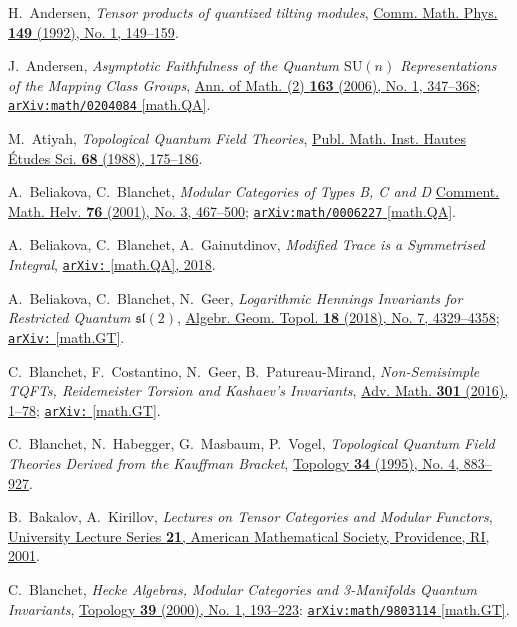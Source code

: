 \documentclass[a4paper,reqno]{amsart}
\theoremstyle{definition}
\theoremstyle{remark}
\newcommand\arxiv[2]{\href{https://arXiv.org/abs/#1}{\texttt{arXiv:\allowbreak #1} #2}}
\newcommand\doi[2]{\href{https://doi.org/#1}{#2}}
\begin{document}
\begin{thebibliography}{99}
 
 H.~Andersen, 
 \textit{Tensor products of quantized tilting modules},
 \doi{10.1007/BF02096627}{Comm. Math. Phys. \textbf{149} (1992), No. 1, 149--159}.
 
 J.~Andersen,
 \textit{Asymptotic Faithfulness of the Quantum $\mathrm{SU}(n)$ Representations of the Mapping Class Groups},
 \doi{10.4007/annals.2006.163.347}{Ann. of Math. (2) \textbf{163} (2006), No. 1, 347--368};
 \arxiv{math/0204084}{[math.QA]}.
 
 M.~Atiyah, 
 \textit{Topological Quantum Field Theories}, 
 \href{http://www.numdam.org/item?id=PMIHES_1988__68__175_0}{Publ. Math. Inst. Hautes Études Sci. \textbf{68} (1988),	175--186}.
 
 A.~Beliakova, C.~Blanchet,
 \textit{Modular Categories of Types B, C and D}
 \doi{10.1007/PL00000385}{Comment. Math. Helv. \textbf{76} (2001), No. 3, 467--500};
 \arxiv{math/0006227}{[math.QA]}.

 A.~Beliakova, C.~Blanchet, A.~Gainutdinov,
 \textit{Modified Trace is a Symmetrised Integral},
 \arxiv{1801.00321}{[math.QA], 2018}.
 
 A.~Beliakova, C.~Blanchet, N.~Geer,
 \textit{Logarithmic Hennings Invariants for Restricted Quantum $\mathfrak{sl}(2)$},
 \doi{10.2140/agt.2018.18.4329}{Algebr. Geom. Topol. \textbf{18} (2018), No. 7, 4329--4358};
 \arxiv{1705.03083}{[math.GT]}.

 C.~Blanchet, F.~Costantino, N.~Geer, B.~Patureau-Mirand,  
 \textit{Non-Semisimple TQFTs, Reidemeister Torsion and Kashaev's Invariants}, 
 \doi{10.1016/j.aim.2016.06.003}{Adv. Math. \textbf{301} (2016), 1--78}; \arxiv{1404.7289}{[math.GT]}.
 
 C.~Blanchet, N.~Habegger, G.~Masbaum, P.~Vogel,
 \textit{Topological Quantum Field Theories Derived from the Kauffman Bracket},
 \doi{10.1016/0040-9383(94)00051-4}{Topology \textbf{34} (1995), No. 4, 883--927}.
 
 B.~Bakalov, A.~Kirillov,
 \textit{Lectures on Tensor Categories and Modular Functors},
 \href{https://bookstore.ams.org/ulect-21/}{University Lecture Series \textbf{21}, American Mathematical Society, Providence, RI, 2001}.
 
 C.~Blanchet,
 \textit{Hecke Algebras, Modular Categories and 3-Manifolds Quantum Invariants},
 \doi{10.1016/S0040-9383(98)00066-4}{Topology \textbf{39} (2000), No. 1, 193--223}:
 \arxiv{math/9803114}{[math.GT]}.
 

\end{thebibliography}
\end{document}
